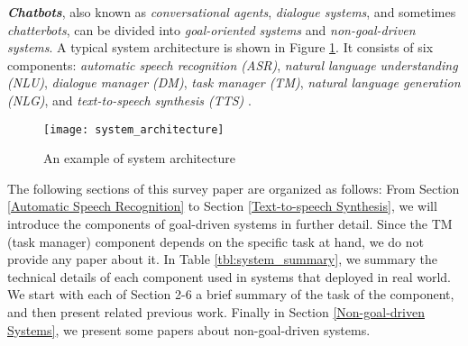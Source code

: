 \textbf{\emph{Chatbots}}, also known as \emph{conversational agents}, \emph{dialogue systems}, and sometimes \emph{chatterbots}, can be divided into \emph{goal-oriented systems} and \emph{non-goal-driven systems}. A typical system architecture is shown in Figure \ref{system architecture}. It consists of six components: \emph{automatic speech recognition (ASR)}, \emph{natural language understanding (NLU)}, \emph{dialogue manager (DM)}, \emph{task manager (TM)}, \emph{natural language generation (NLG)}, and \emph{text-to-speech synthesis (TTS)} \cite{Jurafsky2006}.

\begin{figure}[htbp]
  \centering
  \texttt{[image: system\_architecture]}
  \caption{An example of system architecture}
	\label{system architecture}
\end{figure}

The following sections of this survey paper are organized as follows: From Section \ref{Automatic Speech Recognition} to Section \ref{Text-to-speech Synthesis}, we will introduce the components of goal-driven systems in further detail. Since the TM (task manager) component depends on the specific task at hand, we do not provide any paper about it. In Table \ref{tbl:system_summary}, we summary the technical details of each component used in systems that deployed in real world. We start with each of Section 2-6 a brief summary of the task of the component, and then present related previous work. Finally in Section \ref{Non-goal-driven Systems}, we present some papers about non-goal-driven systems.
